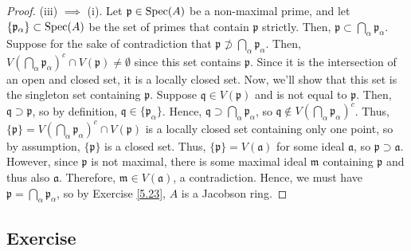 \begin{proof}
(iii) $\implies$ (i). Let $\mathfrak{p} \in \operatorname{Spec}(A)$ be a non-maximal prime, and let $\{\mathfrak{p}_{\alpha}\} \subset \operatorname{Spec}(A)$ be the set of primes that contain
$\mathfrak{p}$ strictly. Then, $\mathfrak{p} \subset \bigcap_{\alpha} \mathfrak{p}_{\alpha}$. Suppose for the sake of contradiction that 
$\mathfrak{p} \not\supset \bigcap_{\alpha} \mathfrak{p}_{\alpha}$. Then, $V\left(\bigcap_{\alpha} \mathfrak{p}_{\alpha}\right)^c \cap V(\mathfrak{p}) \neq \emptyset$
since this set contains $\mathfrak{p}$. Since it is the intersection of an open and closed set, it is a locally closed set. Now, we'll show that this set is the
singleton set containing $\mathfrak{p}$. Suppose $\mathfrak{q} \in V(\mathfrak{p})$ and is not equal to $\mathfrak{p}$. Then, $\mathfrak{q} \supset \mathfrak{p}$,
so by definition, $\mathfrak{q} \in \{\mathfrak{p}_{\alpha}\}$. Hence, $\mathfrak{q} \supset \bigcap_{\alpha} \mathfrak{p}_{\alpha}$, so 
$\mathfrak{q} \not\in V\left(\bigcap_{\alpha} \mathfrak{p}_{\alpha}\right)^c$. Thus, $\{\mathfrak{p}\} = V\left(\bigcap_{\alpha} \mathfrak{p}_{\alpha}\right)^c \cap V(\mathfrak{p})$
is a locally closed set containing only one point, so by assumption, $\{\mathfrak{p}\}$ is a closed set. Thus, $\{\mathfrak{p}\} = V(\mathfrak{a})$ for some ideal $\mathfrak{a}$,
so $\mathfrak{p} \supset \mathfrak{a}$. However, since $\mathfrak{p}$ is not maximal, there is some maximal ideal $\mathfrak{m}$ containing $\mathfrak{p}$ and thus also $\mathfrak{a}$.
Therefore, $\mathfrak{m} \in V(\mathfrak{a})$, a contradiction. Hence, we must have $\mathfrak{p} = \bigcap_{\alpha} \mathfrak{p}_{\alpha}$, so by Exercise \ref{5.23},
$A$ is a Jacobson ring.
\end{proof}

\subsection{Exercise}\label{5.27}

